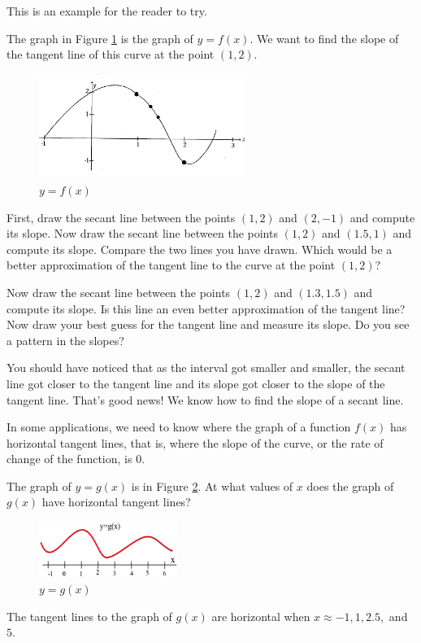 This is an example for the reader to try.
\begin{example}
The graph in Figure \ref{fig:2-2-curve-for-tangents} is the graph of $y=f(x)$. We want to find the slope of the tangent line of this curve at the point $(1, 2)$.
\begin{figure}[!ht]
  \centering
    \includegraphics[width=0.6\textwidth]{img/chap2/image005.png}
    \caption{$y=f(x)$}
    \label{fig:2-2-curve-for-tangents}
\end{figure}

\begin{solution}
First, draw the secant line between the points $(1, 2)$ and $(2, -1)$ and compute its slope. Now draw the secant line between the points $(1, 2)$ and $(1.5, 1)$ and compute its slope. Compare the two lines you have drawn. Which would be a better approximation of the tangent line to the curve at the point $(1, 2)$?

Now draw the secant line between the points $(1, 2)$ and $(1.3, 1.5)$ and compute its slope. Is this line an even better approximation of the tangent line? Now draw your best guess for the tangent line and measure its slope. Do you see a pattern in the slopes?

You should have noticed that as the interval got smaller and smaller, the secant line got closer to the tangent line and its slope got closer to the slope of the tangent line. That's good news! We know how to find the slope of a secant line.
\end{solution}
\end{example}

In some applications, we need to know where the graph of a function $f(x)$ has horizontal tangent lines, that is, where the slope of the curve, or the rate of change of the function, is $0$.

\begin{example}
The graph of $y=g(x)$ is in Figure \ref{fig:2-2-gx}. At what values of $x$ does the graph of $g(x)$ have horizontal tangent lines?
\begin{figure}[!ht]
  \centering
    \includegraphics[width=0.4\textwidth]{img/chap2/image006.png}
    \caption{$y=g(x)$}
    \label{fig:2-2-gx}
\end{figure}

\begin{solution}
The tangent lines to the graph of $g(x)$ are horizontal when $x\approx -1,1,2.5,$ and $5$.
\end{solution}\end{example}

